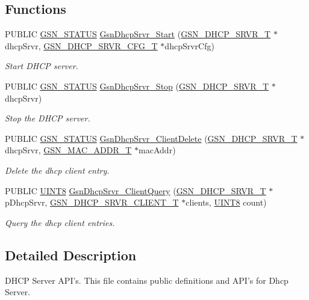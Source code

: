 \subsection*{Functions}
\begin{DoxyCompactItemize}
\item 
PUBLIC \hyperlink{a00660_gada5951904ac6110b1fa95e51a9ddc217}{GSN\_\-STATUS} \hyperlink{a00661_gac04808b6c079b9f20bb2a8d1a3805630}{GsnDhcpSrvr\_\-Start} (\hyperlink{a00043}{GSN\_\-DHCP\_\-SRVR\_\-T} $\ast$dhcpSrvr, \hyperlink{a00044}{GSN\_\-DHCP\_\-SRVR\_\-CFG\_\-T} $\ast$dhcpSrvrCfg)
\begin{DoxyCompactList}\small\item\em Start DHCP server. \end{DoxyCompactList}\item 
PUBLIC \hyperlink{a00660_gada5951904ac6110b1fa95e51a9ddc217}{GSN\_\-STATUS} \hyperlink{a00661_ga1ed16aa486ac47bcaebe60b62132c569}{GsnDhcpSrvr\_\-Stop} (\hyperlink{a00043}{GSN\_\-DHCP\_\-SRVR\_\-T} $\ast$dhcpSrvr)
\begin{DoxyCompactList}\small\item\em Stop the DHCP server. \end{DoxyCompactList}\item 
PUBLIC \hyperlink{a00660_gada5951904ac6110b1fa95e51a9ddc217}{GSN\_\-STATUS} \hyperlink{a00661_ga8fa3791028d92350c2d4ec346a0b8ffe}{GsnDhcpSrvr\_\-ClientDelete} (\hyperlink{a00043}{GSN\_\-DHCP\_\-SRVR\_\-T} $\ast$dhcpSrvr, \hyperlink{a00416}{GSN\_\-MAC\_\-ADDR\_\-T} $\ast$macAddr)
\begin{DoxyCompactList}\small\item\em Delete the dhcp client entry. \end{DoxyCompactList}\item 
PUBLIC \hyperlink{a00660_gab27e9918b538ce9d8ca692479b375b6a}{UINT8} \hyperlink{a00661_ga28fb2f33b4dd3b44f02c5278f081104a}{GsnDhcpSrvr\_\-ClientQuery} (\hyperlink{a00043}{GSN\_\-DHCP\_\-SRVR\_\-T} $\ast$pDhcpSrvr, \hyperlink{a00045}{GSN\_\-DHCP\_\-SRVR\_\-CLIENT\_\-T} $\ast$clients, \hyperlink{a00660_gab27e9918b538ce9d8ca692479b375b6a}{UINT8} count)
\begin{DoxyCompactList}\small\item\em Query the dhcp client entries. \end{DoxyCompactList}\end{DoxyCompactItemize}


\subsection{Detailed Description}
DHCP Server API's. This file contains public definitions and API's for Dhcp Server. \par


